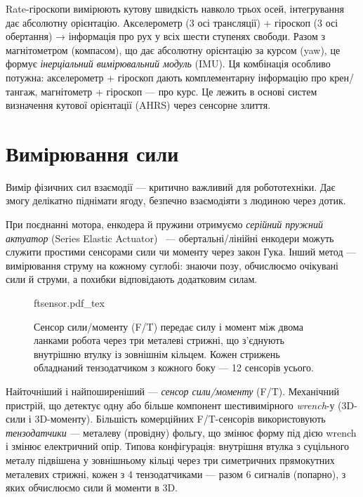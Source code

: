 Rate-гіроскопи вимірюють кутову швидкість навколо трьох осей, інтегрування дає абсолютну орієнтацію. Акселерометр (3 осі трансляції) + гіроскоп (3 осі обертання) → інформація про рух у всіх шести ступенях свободи. Разом з магнітометром (компасом), що дає абсолютну орієнтацію за курсом (yaw), це формує \emph{інерціальний вимірювальний модуль} (IMU). Ця комбінація особливо потужна: акселерометр + гіроскоп дають комплементарну інформацію про крен/тангаж, магнітометр + гіроскоп — про курс. Це лежить в основі систем визначення кутової орієнтації (AHRS) через сенсорне злиття.

\section{Вимірювання сили}
Вимір фізичних сил взаємодії — критично важливий для робототехніки. Дає змогу делікатно піднімати ягоду, безпечно взаємодіяти з людиною через дотик.

При поєднанні мотора, енкодера й пружини отримуємо \emph{серійний пружний актуатор} (Series Elastic Actuator)~\cite{pratt1995series} — обертальні/лінійні енкодери можуть служити простими сенсорами сили чи моменту через закон Гука. Інший метод — вимірювання струму на кожному суглобі: знаючи позу, обчислюємо очікувані сили й струми, а похибки відповідають додатковим силам.

\begin{figure}
    \centering
    \def\svgwidth{0.9\textwidth}
    {ftsensor.pdf_tex}
    \caption{Сенсор сили/моменту (F/T) передає силу і момент між двома ланками робота через три металеві стрижні, що з'єднують внутрішню втулку із зовнішнім кільцем. Кожен стрижень обладнаний тензодатчиком з кожного боку — 12 сенсорів усього. \label{fig:ftsensor}}
\end{figure}

Найточніший і найпоширеніший — \emph{сенсор сили/моменту} (F/T). Механічний пристрій, що детектує одну або більше компонент шестивимірного \emph{wrench}-у (3D-сили і 3D-моменту). Більшість комерційних F/T-сенсорів використовують \emph{тензодатчики} — металеву (провідну) фольгу, що змінює форму під дією wrench і змінює електричний опір. Типова конфігурація: внутрішня втулка з суцільного металу підвішена у зовнішньому кільці через три симетричних прямокутних металевих стрижні, кожен з 4 тензодатчиками — разом 6 сигналів (попарно), з яких обчислюємо сили й моменти в 3D.

